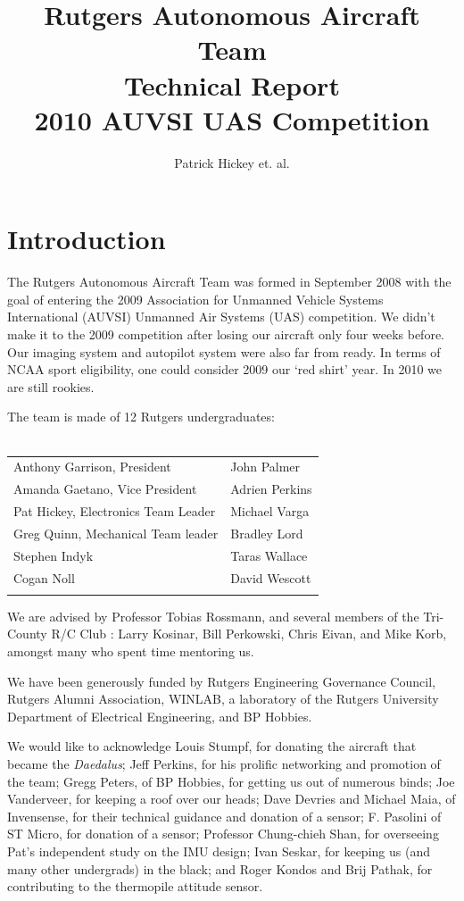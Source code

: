 \documentclass[pdftex,10pt,letter]{article}
\begin{document}
\title{Rutgers Autonomous Aircraft Team\\Technical Report\\2010 AUVSI UAS Competition}
\author{Patrick Hickey et. al.}


\section{Introduction}

The Rutgers Autonomous Aircraft Team was formed in September 2008 with the goal of entering the 2009 Association for Unmanned Vehicle Systems International (AUVSI)\cite{auvsiweb} Unmanned Air Systems (UAS) competition\cite{uasweb}. We didn't make it to the 2009 competition after losing our aircraft only four weeks before. Our imaging system and autopilot system were also far from ready. In terms of NCAA sport eligibility, one could consider 2009 our `red shirt' year. In 2010 we are still rookies.

The team is made of 12 Rutgers undergraduates:\\
\\ \begin{tabular}{l l}
Anthony Garrison, President & John Palmer \\
Amanda Gaetano, Vice President & Adrien Perkins\\
Pat Hickey, Electronics Team Leader & Michael Varga\\
Greg Quinn, Mechanical Team leader & Bradley Lord\\
Stephen Indyk & Taras Wallace\\ 
Cogan Noll & David Wescott\\ \\
\end{tabular}

We are advised by
 Professor Tobias Rossmann,
 and several members of the Tri-County R/C Club \cite{tricountyRC}:
 Larry Kosinar,
 Bill Perkowski,
Chris Eivan,
and  Mike Korb, 
amongst many who spent time mentoring us.

We have been generously funded by 
Rutgers Engineering Governance Council,
Rutgers Alumni Association,
WINLAB, a laboratory of the Rutgers University Department of Electrical Engineering, 
and BP Hobbies. 

We would like to acknowledge
Louis Stumpf, for donating the aircraft that became the \emph{Daedalus};
Jeff Perkins, for his prolific networking and promotion of the team;
Gregg Peters, of BP Hobbies, for getting us out of numerous binds;
Joe Vanderveer, for keeping a roof over our heads;
Dave Devries and Michael Maia, of Invensense, for their technical guidance and donation of a sensor;
F. Pasolini of ST Micro, for donation of a sensor;
Professor Chung-chieh Shan, for overseeing Pat's independent study on the IMU design;
Ivan Seskar, for keeping us (and many other undergrads) in the black; and
Roger Kondos and Brij Pathak, for contributing to the thermopile attitude sensor.
\end{document}
